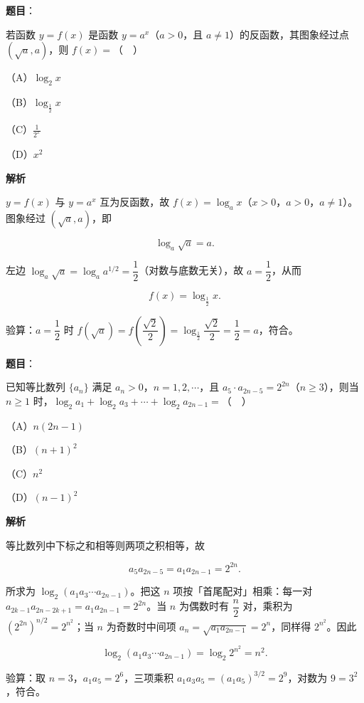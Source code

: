 \begin{answer}

\textbf{题目}：

若函数 $y=f(x)$ 是函数 $y=a^x$（$a>0$，且 $a\neq1$）的反函数，其图象经过点 $(\sqrt a,a)$，则 $f(x)=$（　）

（A）$\log_2 x$

（B）$\log_{\frac12}x$

（C）$\frac{1}{2^x}$

（D）$x^2$

\textbf{解析}

$y=f(x)$ 与 $y=a^x$ 互为反函数，故 $f(x)=\log_a x$（$x>0$，$a>0$，$a\neq1$）。图象经过 $(\sqrt a,a)$，即

\nopagebreak[4]
\[\log_a\sqrt a=a.\]

左边 $\log_a\sqrt a=\log_a a^{1/2}=\dfrac12$（对数与底数无关），故 $a=\dfrac12$，从而

\nopagebreak[4]
\[f(x)=\log_{\frac12}x.\]

验算：$a=\dfrac12$ 时 $f(\sqrt a)=f\left(\dfrac{\sqrt2}{2}\right)=\log_{\frac12}\dfrac{\sqrt2}{2}=\dfrac12=a$，符合。


\end{answer}
\begin{answer}

\textbf{题目}：

已知等比数列 $\{a_n\}$ 满足 $a_n>0$，$n=1,2,\cdots$，且 $a_5\cdot a_{2n-5}=2^{2n}$（$n\geqslant3$），则当 $n\geqslant1$ 时，$\log_2 a_1+\log_2 a_3+\cdots+\log_2 a_{2n-1}=$（　）

（A）$n(2n-1)$

（B）$(n+1)^2$

（C）$n^2$

（D）$(n-1)^2$

\textbf{解析}

等比数列中下标之和相等则两项之积相等，故

\nopagebreak[4]
\[a_5a_{2n-5}=a_1a_{2n-1}=2^{2n}.\]

所求为 $\log_2(a_1a_3\cdots a_{2n-1})$。把这 $n$ 项按「首尾配对」相乘：每一对 $a_{2k-1}a_{2n-2k+1}=a_1a_{2n-1}=2^{2n}$。当 $n$ 为偶数时有 $\dfrac n2$ 对，乘积为 $(2^{2n})^{n/2}=2^{n^2}$；当 $n$ 为奇数时中间项 $a_n=\sqrt{a_1a_{2n-1}}=2^n$，同样得 $2^{n^2}$。因此

\nopagebreak[4]
\[\log_2(a_1a_3\cdots a_{2n-1})=\log_2 2^{n^2}=n^2.\]

验算：取 $n=3$，$a_1a_5=2^6$，三项乘积 $a_1a_3a_5=(a_1a_5)^{3/2}=2^9$，对数为 $9=3^2$，符合。


\end{answer}
